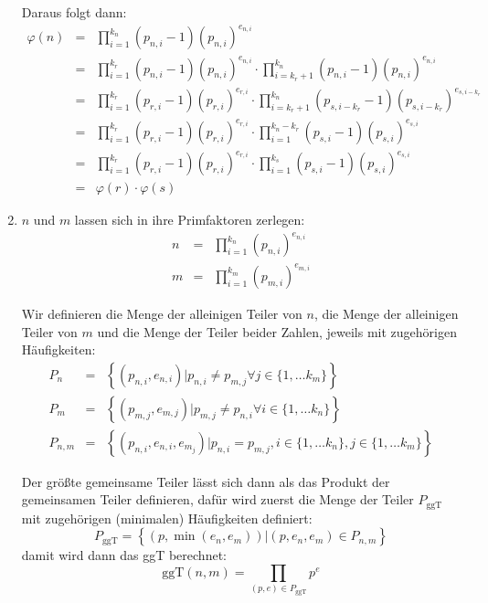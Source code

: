 \documentclass[DIN, pagenumber=false, fontsize=11pt, parskip=half]{scrartcl}
\begin{document}
\begin{enumerate}[label=(\roman*)]
            Daraus folgt dann:
            \begin{eqnarray}
                \varphi(n) &=& \prod_{i=1}^{k_n} (p_{n,i} - 1) {(p_{n,i})}^{e_{n,i}} \\
                        &=& \prod_{i=1}^{k_r} (p_{n,i} - 1) {(p_{n,i})}^{e_{n,i}} \cdot
                            \prod_{i=k_r+1}^{k_n} (p_{n,i} - 1) {(p_{n,i})}^{e_{n,i}} \\
                        &=& \prod_{i=1}^{k_r} (p_{r,i} - 1) {(p_{r,i})}^{e_{r,i}} \cdot
                            \prod_{i=k_r+1}^{k_n} (p_{s,i-k_r} - 1) {(p_{s,i-k_r})}^{e_{s,i-k_r}} \\
                        &=& \prod_{i=1}^{k_r} (p_{r,i} - 1) {(p_{r,i})}^{e_{r,i}} \cdot
                            \prod_{i=1}^{k_n-k_r} (p_{s,i} - 1) {(p_{s,i})}^{e_{s,i}} \\
                        &=& \prod_{i=1}^{k_r} (p_{r,i} - 1) {(p_{r,i})}^{e_{r,i}} \cdot
                            \prod_{i=1}^{k_s} (p_{s,i} - 1) {(p_{s,i})}^{e_{s,i}} \\
                        &=& \varphi(r) \cdot \varphi(s)
            \end{eqnarray}
        \item
            $n$ und $m$ lassen sich in ihre Primfaktoren zerlegen:
            \begin{eqnarray}
                n &=& \prod_{i=1}^{k_n} {(p_{n,i})}^{e_{n,i}} \\
                m &=& \prod_{i=1}^{k_m} {(p_{m,i})}^{e_{m,i}}
            \end{eqnarray}

            Wir definieren die Menge der alleinigen Teiler von $n$, die Menge
            der alleinigen Teiler von $m$ und die Menge der Teiler beider Zahlen,
            jeweils mit zugehörigen Häufigkeiten:
            \begin{eqnarray}
                P_n &=& \left\{(p_{n,i}, e_{n,i}) | p_{n,i} \neq p_{m,j} \forall j \in \{1, \ldots k_m\} \right\} \\
                P_m &=& \left\{(p_{m,j}, e_{m,j}) | p_{m,j} \neq p_{n,i} \forall i \in \{1, \ldots k_n\} \right\} \\
                P_{n, m} &=& \left\{(p_{n,i}, e_{n,i}, e_{m_j}) | p_{n,i} = p_{m,j}, 
                    i \in \{1, \ldots k_n\}, j \in \{1, \ldots k_m\}\right\}
            \end{eqnarray}
            
            Der größte gemeinsame Teiler lässt sich dann als das Produkt
            der gemeinsamen Teiler definieren, dafür wird zuerst die Menge
            der Teiler $P_\text{ggT}$ mit zugehörigen (minimalen) Häufigkeiten definiert:
            \begin{equation}
                P_\text{ggT} = \left\{\left(p, \min(e_n, e_m)\right) | (p, e_n, e_m) \in P_{n,m} \right\}
            \end{equation}
            damit wird dann das ggT berechnet:
            \begin{equation}
                \text{ggT}(n, m) = \prod_{(p, e) \in P_\text{ggT}} p^e 
            \end{equation}


\end{enumerate}
\end{document}
